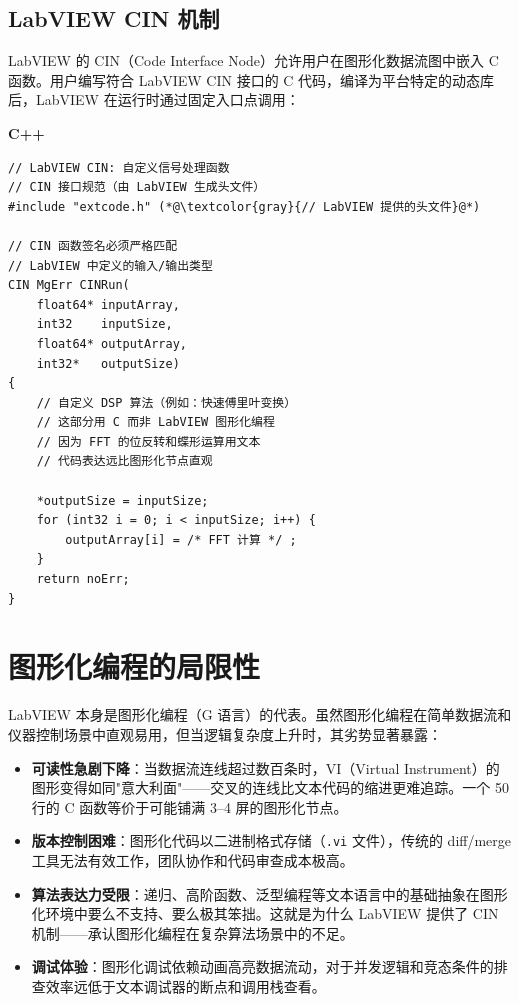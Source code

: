 \documentclass[12pt,a4paper,fontset=fandol]{ctexbook}
\newenvironment{warning}[1][]{%
  \begin{tcolorbox}[enhanced,breakable,
    colback=red!5!white,colframe=red!75!black,
    boxed title style={colback=red!75!black},
    attach boxed title to top left={yshift=-2mm,xshift=2mm},
    arc=2mm,boxrule=0.8mm,
    title={常见陷阱},#1]}%
  {\end{tcolorbox}}
\newcommand{\Tp}[1]{\texttt{#1}}
\newcommand{\cpplabel}{%
  \noindent\begin{tcolorbox}[colback=algheadbg,coltext=white,
    sharp corners,boxrule=0pt,width=3.0em,height=1.4em,
    halign=center,valign=center,nobeforeafter,left=0pt,right=0pt,
    top=0pt,bottom=0pt]\small\bfseries C++\end{tcolorbox}}
\begin{document}
\subsection{LabVIEW CIN 机制}\label{sec:labview-cin}

LabVIEW 的 CIN（Code Interface Node）允许用户在图形化数据流图中嵌入 C 函数。用户编写符合 LabVIEW CIN 接口的 C 代码，编译为平台特定的动态库后，LabVIEW 在运行时通过固定入口点调用：

\cpplabel
\begin{lstlisting}[style=cppstyle]
// LabVIEW CIN: 自定义信号处理函数
// CIN 接口规范（由 LabVIEW 生成头文件）
#include "extcode.h" (*@\textcolor{gray}{// LabVIEW 提供的头文件}@*)

// CIN 函数签名必须严格匹配
// LabVIEW 中定义的输入/输出类型
CIN MgErr CINRun(
    float64* inputArray,
    int32    inputSize,
    float64* outputArray,
    int32*   outputSize)
{
    // 自定义 DSP 算法（例如：快速傅里叶变换）
    // 这部分用 C 而非 LabVIEW 图形化编程
    // 因为 FFT 的位反转和蝶形运算用文本
    // 代码表达远比图形化节点直观

    *outputSize = inputSize;
    for (int32 i = 0; i < inputSize; i++) {
        outputArray[i] = /* FFT 计算 */ ;
    }
    return noErr;
}
\end{lstlisting}

\section{图形化编程的局限性}\label{sec:gpl-limits}

LabVIEW 本身是图形化编程（G 语言）的代表。虽然图形化编程在简单数据流和仪器控制场景中直观易用，但当逻辑复杂度上升时，其劣势显著暴露：

\begin{warning}[title={图形化编程的复杂度瓶颈}]
\begin{itemize}
  \item \textbf{可读性急剧下降}：当数据流连线超过数百条时，VI（Virtual Instrument）的图形变得如同"意大利面"——交叉的连线比文本代码的缩进更难追踪。一个 50 行的 C 函数等价于可能铺满 3--4 屏的图形化节点。
  \item \textbf{版本控制困难}：图形化代码以二进制格式存储（\Tp{.vi} 文件），传统的 diff/merge 工具无法有效工作，团队协作和代码审查成本极高。
  \item \textbf{算法表达力受限}：递归、高阶函数、泛型编程等文本语言中的基础抽象在图形化环境中要么不支持、要么极其笨拙。这就是为什么 LabVIEW 提供了 CIN 机制——承认图形化编程在复杂算法场景中的不足。
  \item \textbf{调试体验}：图形化调试依赖动画高亮数据流动，对于并发逻辑和竞态条件的排查效率远低于文本调试器的断点和调用栈查看。
\end{itemize}
\end{warning}
\end{document}

